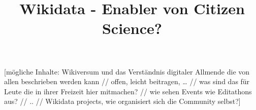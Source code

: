 \documentclass{article}
\begin{document}
\title{Wikidata - Enabler von Citizen Science?}

\maketitle





[mögliche Inhalte: Wikiversum und das Verständnis digitaler Allmende die von allen beschrieben werden kann // offen, leicht beitragen, … // was sind das für Leute die in ihrer Freizeit hier mitmachen? // wie sehen Events wie Editathons aus? // .. // Wikidata projects, wie organisiert sich die Community selbst?]
\end{document}
